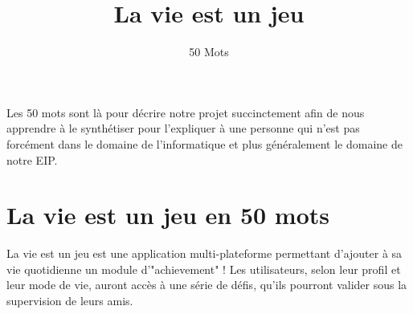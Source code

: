 \documentclass{life-fr}
\begin{document}
\title{La vie est un jeu}
\subtitle{50 Mots}

\summary
{
  Les 50 mots sont là pour décrire notre projet succinctement
  afin de nous apprendre à le synthétiser pour l'expliquer à
  une personne qui n'est pas forcément dans le domaine de
  l'informatique et plus généralement le domaine de notre EIP.
}

\maketitle


\chapter{La vie est un jeu en 50 mots}

La vie est un jeu est une application multi-plateforme permettant d’ajouter à
sa vie quotidienne un module d’"achievement" ! Les utilisateurs, selon leur
profil et leur mode de vie, auront accès à une série de défis, qu’ils pourront
valider sous la supervision de leurs amis.
\end{document}
